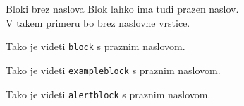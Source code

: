 \documentclass{beamer}
\begin{document}

   
   \begin{frame}
      {Bloki brez naslova}
      Blok lahko ima tudi prazen naslov. \\
      V takem primeru bo brez naslovne vrstice.
         
         \begin{block}{}
            Tako je videti \texttt{block} s praznim naslovom.
         \end{block}
         
         \begin{exampleblock}{}
            Tako je videti \texttt{exampleblock} s praznim naslovom.
         \end{exampleblock}
         
         \begin{alertblock}{}
            Tako je videti \texttt{alertblock} s praznim naslovom.
         \end{alertblock}
   \end{frame}

\end{document}
